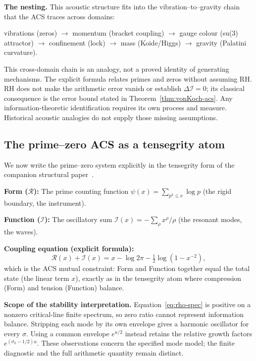 \documentclass[11pt,a4paper]{article}
\theoremstyle{plain}
\theoremstyle{definition}
\theoremstyle{remark}
\newcommand{\DI}{\Delta\mathcal{I}}
\begin{document}
\textbf{The nesting.}  This acoustic structure fits into the
vibration--to--gravity chain that the ACS traces across domains:
\begin{center}
\small
vibrations (zeros) $\to$ momentum (bracket coupling) $\to$
gauge colour (\textsf{su(3)} attractor) $\to$ confinement (lock)
$\to$ mass (Koide/Higgs) $\to$ gravity (Palatini curvature).
\end{center}
This cross-domain chain is an analogy, not a proved identity of generating
mechanisms. The explicit formula relates primes and zeros without assuming
RH. RH does not make the arithmetic error vanish or establish $\DI=0$;
its classical consequence is the error bound stated in
Theorem~\ref{thm:vonKoch-acs}. Any information-theoretic identification
requires its own process and measure. Historical acoustic analogies do not
supply those missing assumptions.

\subsection{The prime--zero ACS as a tensegrity atom}

We now write the prime--zero system explicitly in the tensegrity form
of the companion structural paper~\cite{Wallace2026c}.

\medskip
\noindent\textbf{Form ($\mathcal{R}$):}
The prime counting function $\psi(x) = \sum_{p^k \leq x} \log p$
(the rigid boundary, the instrument).

\medskip
\noindent\textbf{Function ($\mathcal{I}$):}
The oscillatory sum $\mathcal{I}(x) = -\sum_\rho x^\rho/\rho$
(the resonant modes, the waves).

\medskip
\noindent\textbf{Coupling equation (explicit formula):}
\[
  \mathcal{R}(x) + \mathcal{I}(x) = x - \log 2\pi - \tfrac{1}{2}\log(1 - x^{-2}),
\]
which is the ACS mutual constraint: Form and Function together equal
the total state (the linear term $x$), exactly as in the tensegrity
atom where compression (Form) and tension (Function) balance.

\medskip
\noindent\textbf{Scope of the stability interpretation.}
Equation~\eqref{eq:rho-spec} is positive on a nonzero critical-line finite
spectrum, so zero ratio cannot represent information balance. Stripping each
mode by its own envelope gives a harmonic oscillator for every $\sigma$.
Using a common envelope $e^{u/2}$ instead retains the relative growth factors
$e^{(\sigma_k-1/2)u}$. These observations concern the specified mode model;
the finite diagnostic and the full arithmetic quantity remain distinct.
\end{document}
